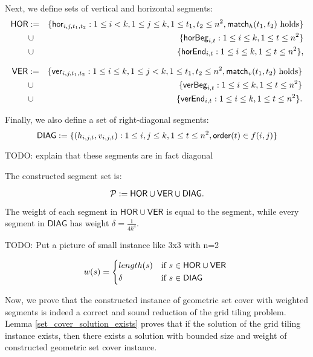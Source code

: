 \newcommand{\allhor}{\mathsf{HOR}}
\newcommand{\allver}{\mathsf{VER}}
\newcommand{\alldiag}{\mathsf{DIAG}}

Next, we define sets of vertical and horizontal segments:
\begin{eqnarray*}
\allhor &:= &\{\hor{i}{j}{t_1}{t_2} : 1 \le i < k, 1 \le j \le k,
1 \le t_1, t_2 \le n^2, \matchh(t_1, t_2) \text{ holds}\} \\
&\cup &\{\horbeg{i}{t} : 1 \le i \le k, 1 \le t \le n^2\}
\\
&\cup &\{\horend{i}{t} : 1 \le i \le k, 1 \le t \le n^2\},
\end{eqnarray*}

\begin{eqnarray*}
\allver &:= &\{\ver{i}{j}{t_1}{t_2} : 1 \le i \le k, 1 \le j < k,
1 \le t_1, t_2 \le n^2, \matchv(t_1, t_2) \text{ holds}\} \\
&\cup &\{\verbeg{i}{t} : 1 \le i \le k, 1 \le t \le n^2\}
\\
&\cup &\{\verend{i}{t} : 1 \le i \le k, 1 \le t \le n^2\}.
\end{eqnarray*}

Finally, we also define a set of right-diagonal segments:
$$\alldiag := \{ (h_{i, j, t}, v_{i, j, t}) :
	1 \le i, j \le k, 1 \le t \le n^2, \order(t) \in f(i, j)\}$$

TODO: explain that these segments are in fact diagonal

The constructed segment set is:

$$\sets := \allhor \cup \allver \cup \alldiag.$$

The weight of each segment in $\allhor \cup \allver$
is equal to the segment,
while every segment in $\alldiag$ has weight
$\delta = \frac{1}{4k^4}$.

TODO: Put a picture of small instance like 3x3 with n=2

\begin{equation}
w(s) =
	\begin{cases*}
	  length(s) 			& if $s \in \allhor \cup \allver$ \\
	  \delta        & if $s \in \alldiag$
	\end{cases*}
\end{equation}

\newcommand{\solWeight}{2k^2(n^2+1) - 4k^2\epsilon -4k(1-\epsilon) +k^2\delta }

Now, we prove that the constructed instance of geometric set cover
with weighted segments is indeed a correct and sound reduction
of the grid tiling problem. Lemma \ref{set_cover_solution_exists}
proves that if the solution of the grid tiling instance exists,
then there exists a solution with bounded size and weight
of constructed geometric set cover instance.


